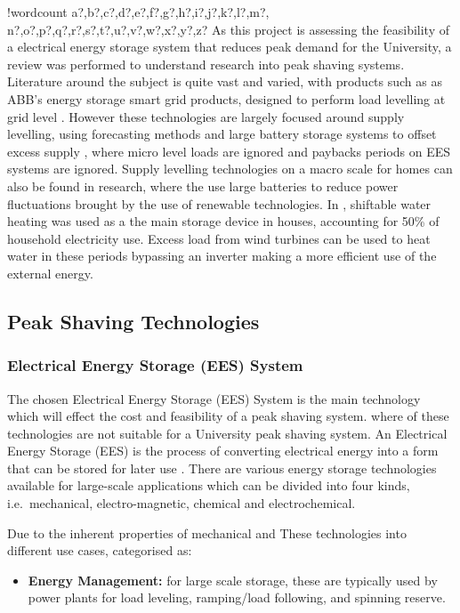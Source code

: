 \documentclass[10pt]{article}
\providecommand{\tightlist}{%
  \setlength{\itemsep}{0pt}\setlength{\parskip}{0pt}}
\newcounter{words}
\newenvironment{counted}{%
  \setcounter{words}{0}
  \SearchList!{wordcount}{\stepcounter{words}}
    {a?,b?,c?,d?,e?,f?,g?,h?,i?,j?,k?,l?,m?,
    n?,o?,p?,q?,r?,s?,t?,u?,v?,w?,x?,y?,z?}
  \UndoBoundary{'}
  \SearchOrder{p;}}{%
  \StopSearching}
\begin{document}
\begin{counted}
As this project is assessing the feasibility of a electrical energy
storage system that reduces peak demand for the University, a review was
performed to understand research into peak shaving systems. Literature
around the subject is quite vast and varied, with products such as as
ABB's energy storage smart grid products, designed to perform load
levelling at grid level \cite{abbpeakshave}. However these technologies
are largely focused around supply levelling, using forecasting methods
and large battery storage systems to offset excess supply
\cite{5559470}, where micro level loads are ignored and paybacks periods
on EES systems are ignored. Supply levelling technologies on a macro
scale for homes can also be found in research, where the use large
batteries to reduce power fluctuations brought by the use of renewable
technologies. In \cite{Allik20161116}, shiftable water heating was used
as a the main storage device in houses, accounting for 50\% of household
electricity use. Excess load from wind turbines can be used to heat
water in these periods bypassing an inverter making a more efficient use
of the external energy. \cite{7564619}

\subsection{Peak Shaving Technologies}\label{peak-shaving-technologies}

\subsubsection{Electrical Energy Storage (EES)
System}\label{electrical-energy-storage-ees-system}

The chosen Electrical Energy Storage (EES) System is the main technology
which will effect the cost and feasibility of a peak shaving system.
where of these technologies are not suitable for a University peak
shaving system. An Electrical Energy Storage (EES) is the process of
converting electrical energy into a form that can be stored for later
use \cite{Chen2009291}. There are various energy storage technologies
available for large-scale applications which can be divided into four
kinds, i.e.~mechanical, electro-magnetic, chemical and electrochemical.

Due to the inherent properties of mechanical and These technologies into
different use cases, categorised as:

\begin{itemize}
\tightlist
\item
  \textbf{Energy Management:} for large scale storage, these are
  typically used by power plants for load leveling, ramping/load
  following, and spinning reserve.


\end{itemize}
\end{counted}
\end{document}
